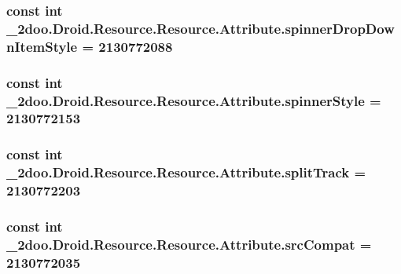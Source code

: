 \hypertarget{class__2doo_1_1_droid_1_1_resource_1_1_attribute_f1e9d5371b9a94f17ad9a12720ce92e0}{
\subsubsection[{spinnerDropDownItemStyle}]{\setlength{\rightskip}{0pt plus 5cm}const int \_\-2doo.Droid.Resource.Resource.Attribute.spinnerDropDownItemStyle = 2130772088}}
\label{class__2doo_1_1_droid_1_1_resource_1_1_attribute_f1e9d5371b9a94f17ad9a12720ce92e0}


\hypertarget{class__2doo_1_1_droid_1_1_resource_1_1_attribute_053d98126e08392fe187a9eb649d9ecf}{
\subsubsection[{spinnerStyle}]{\setlength{\rightskip}{0pt plus 5cm}const int \_\-2doo.Droid.Resource.Resource.Attribute.spinnerStyle = 2130772153}}
\label{class__2doo_1_1_droid_1_1_resource_1_1_attribute_053d98126e08392fe187a9eb649d9ecf}


\hypertarget{class__2doo_1_1_droid_1_1_resource_1_1_attribute_4d153775c75187c30e750002e480dec0}{
\subsubsection[{splitTrack}]{\setlength{\rightskip}{0pt plus 5cm}const int \_\-2doo.Droid.Resource.Resource.Attribute.splitTrack = 2130772203}}
\label{class__2doo_1_1_droid_1_1_resource_1_1_attribute_4d153775c75187c30e750002e480dec0}


\hypertarget{class__2doo_1_1_droid_1_1_resource_1_1_attribute_46aea96506ddc33d8aaa3bdd08c2a3d1}{
\subsubsection[{srcCompat}]{\setlength{\rightskip}{0pt plus 5cm}const int \_\-2doo.Droid.Resource.Resource.Attribute.srcCompat = 2130772035}}
\label{class__2doo_1_1_droid_1_1_resource_1_1_attribute_46aea96506ddc33d8aaa3bdd08c2a3d1}


